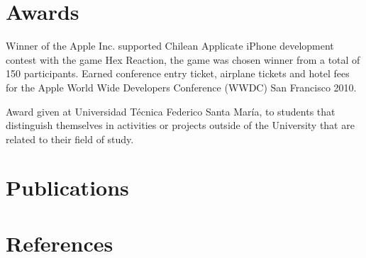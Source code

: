\documentclass[10pt, a4paper, dvips]{moderncv}
\begin{document}
\section{Awards}
{
\begin{scriptsize}
Winner of the Apple Inc. supported Chilean Applicate iPhone development contest with the game Hex Reaction, the game was chosen winner from a total of 150 participants. Earned conference entry ticket, airplane tickets and hotel fees for the Apple World Wide Developers Conference (WWDC) San Francisco 2010.\\
\end{scriptsize}
}

{
\begin{scriptsize}
Award given at Universidad T\'ecnica Federico Santa Mar\'ia, to students that distinguish themselves in activities or projects outside of the University that are related to their field of study.
\end{scriptsize}
}

\section{Publications}

\section{References}
{
}
\end{document}

